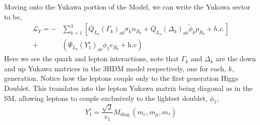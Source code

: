 Moving onto the Yukawa portion of the Model, we can write the Yukawa sector to be,
\begin{equation} \label{eq:3HDM_Yuk} \begin{split} 
\mathcal{L}_Y = - & \sum_{k=1}^3 \left[ \overline{Q}_{L_a} \left( \Gamma_k \right)_{ab} \sigma_k n_{R_b} + \overline{Q}_{L_a} \left( \Delta_k \right)_{ab} \tilde{\phi}_k p_{R_b} + h.c.  \right] \\ + & \left( \Psi_{L_a} \left( Y^e_1 \right)_{ab} \phi_1 e_{R_b} + \text{h.c} \right)
\end{split} \end{equation}   
Here we see the quark and lepton interactions, note that $\Gamma_k$ and $\Delta_k$ are the down and up Yukawa matrices in the 3HDM model respectively, one for each, $k$, generation.
%
Notice how the leptons couple only to the first generation Higgs Doublet. 
%
This translates into the lepton Yukawa matrix being diagonal as in the SM, allowing leptons to couple exclusively to the lightest doublet, $\phi_1$, 
%
\begin{equation}
Y^e_1 = \frac{\sqrt{2}}{v_1} M_{\text{diag.}}\left( m_e , m_\mu , m_\tau \right)
\end{equation} 

